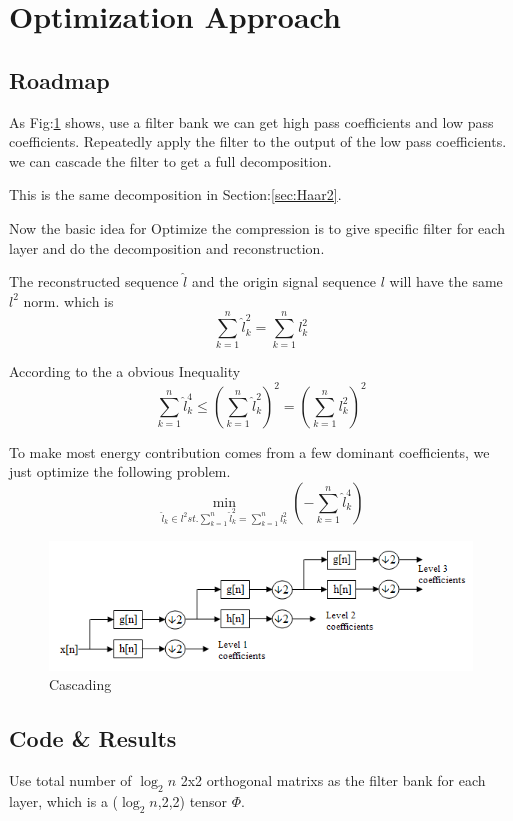 \documentclass{article}
\theoremstyle{definition} %
\begin{document}
\section{Optimization Approach}
\subsection{Roadmap}
As Fig:\ref{fig:filterCascade} shows, use a filter
bank we can get high pass coefficients and low pass coefficients.
Repeatedly apply the filter to the output of the low pass coefficients.
we can cascade the filter to get a full decomposition.

This is the same decomposition in Section:\ref{sec:Haar2}.

Now the basic idea for Optimize the compression is to give
specific filter for each layer and do the decomposition
and reconstruction.

The reconstructed sequence \(\hat{l}\) and the origin signal
sequence \(l\) will have the same \(l^2\) norm.
which is
\[
    \sum_{k=1}^{n}\hat{l}_k^2=\sum_{k=1}^{n}l_k^2
\]

According to the a obvious Inequality
\[
    \sum_{k=1}^{n}\hat{l}_k^4
    \leq
    (\sum_{k=1}^{n}\hat{l}_k^2)^2
    =
    (\sum_{k=1}^{n}l_k^2)^2
\]

To make most energy contribution comes from a few
dominant coefficients, we just optimize the following
problem.
\[
    \min_{\hat{l}_k\in l^2 st. \sum_{k=1}^{n}\hat{l}_k^2=\sum_{k=1}^{n}l_k^2}(-\sum_{k=1}^{n}\hat{l}_k^4)
\]

\begin{figure}[ht!]
    \centering
    \includegraphics[width=1.0\textwidth]{fig/Wavelets_-_Filter_Bank.png}
    \caption{Cascading}
    \label{fig:filterCascade}
\end{figure}

\subsection{Code \& Results}
Use total number of \(\log_{2}n\) 2x2 orthogonal matrixs as the
filter bank for each layer, which is a (\(\log_{2}n\),2,2) tensor
\(\Phi\).
\end{document}
